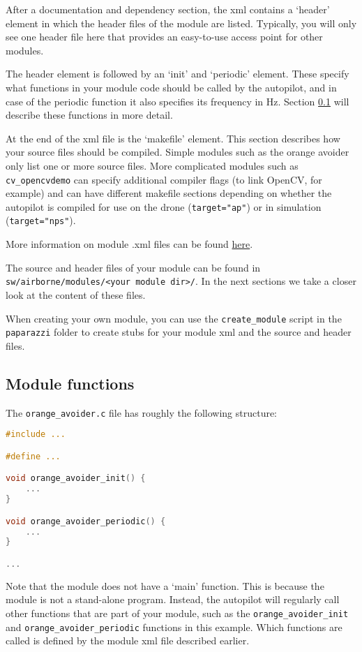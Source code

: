 \documentclass{article}
\begin{document}
After a documentation and dependency section, the xml contains a `header' element in which the header files of the module are listed. Typically, you will only see one header file here that provides an easy-to-use access point for other modules.

The header element is followed by an `init' and `periodic' element. These specify what functions in your module code should be called by the autopilot, and in case of the periodic function it also specifies its frequency in Hz. Section \ref{sec:callbacks} will describe these functions in more detail.

At the end of the xml file is the `makefile' element. This section describes how your source files should be compiled. Simple modules such as the orange avoider only list one or more source files. More complicated modules such as \texttt{cv\_opencvdemo} can specify additional compiler flags (to link OpenCV, for example) and can have different makefile sections depending on whether the autopilot is compiled for use on the drone (\texttt{target="ap"}) or in simulation (\texttt{target="nps"}).

More information on module .xml files can be found \href{https://wiki.paparazziuav.org/wiki/Modules}{here}.

The source and header files of your module can be found in \texttt{sw/airborne/modules/<your module dir>/}. In the next sections we take a closer look at the content of these files.

When creating your own module, you can use the \texttt{create\_module} script in the \texttt{paparazzi} folder to create stubs for your module xml and the source and header files.



\subsection{Module functions}\label{sec:callbacks}
The \texttt{orange\_avoider.c} file has roughly the following structure:
\begin{lstlisting}[language=c]
#include ...

#define ...

void orange_avoider_init() {
	...
}

void orange_avoider_periodic() {
	...
}

...
\end{lstlisting}

Note that the module does not have a `main' function. This is because the module is not a stand-alone program. Instead, the autopilot will regularly call other functions that are part of your module, such as the \texttt{orange\_avoider\_init} and \texttt{orange\_avoider\_periodic} functions in this example. Which functions are called is defined by the module xml file described earlier.
\end{document}
